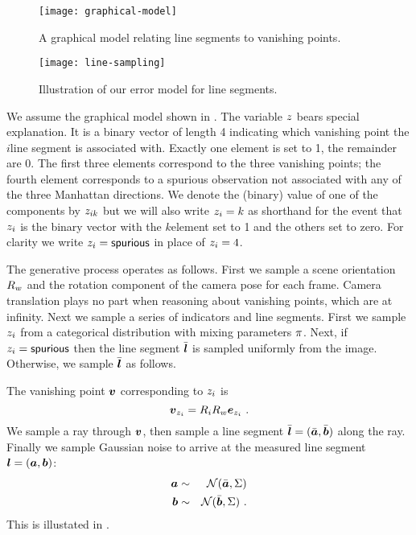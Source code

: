 \begin{figure}[tb]
  \centering
  \texttt{[image: graphical-model]}
  \caption{A graphical model relating line segments to vanishing
    points.}
  \label{fig:R-graphical}
\end{figure}

\begin{figure}[tb]
  \centering
  \texttt{[image: line-sampling]}
  \caption{Illustration of our error model for line segments.}
  \label{fig:line-sampling}
\end{figure}

We assume the graphical model shown in . The
variable $\Indicator$ bears special explanation. It is a binary vector
of length 4 indicating which vanishing point the $i$\th line segment
is associated with. Exactly one element is set to 1, the remainder are
0. The first three elements correspond to the three vanishing points;
the fourth element corresponds to a spurious observation not
associated with any of the three Manhattan directions. We denote
the (binary) value of one of the components by $\Indicator_{ik}$ but
we will also write $\Indicator_i=k$ as shorthand for the event that
$\Indicator_i$ is the binary vector with the $k$\th element set to 1
and the others set to zero. For clarity we write
$\Indicator_i=\Spurious$ in place of $\Indicator_i=4$.

The generative process operates as follows. First we sample a scene
orientation $\SceneR$ and the rotation component of the camera pose
for each frame. Camera translation plays no part when reasoning about
vanishing points, which are at infinity. Next we sample a series of
indicators and line segments. First we sample $\Indicator_i$ from a
categorical distribution with mixing parameters $\Mixing$. Next, if
$\Indicator_i=\Spurious$ then the line segment $\TrueSeg$ is sampled
uniformly from the image. Otherwise, we sample $\TrueSeg$ as follows.

The vanishing point $\vpt$ corresponding to $\Indicator_i$ is
\begin{equation}
  \vpt_{\Indicator_i} = \CamR_i \SceneR \ebasis_{\Indicator_i} ~.
\end{equation}
We sample a ray through $\vpt$, then sample a line segment $\TrueSeg =
(\TrueStartPt,\TrueEndPt)$ along the ray. Finally we sample Gaussian
noise to arrive at the measured line segment
$\LineSeg=(\StartPt,\EndPt)$:
\begin{eqnarray}
  \StartPt &\sim& \NormalDistr(\TrueStartPt, \Sigma) \\
  \EndPt &\sim& \NormalDistr(\TrueEndPt, \Sigma) ~.
\end{eqnarray}
This is illustated in .

